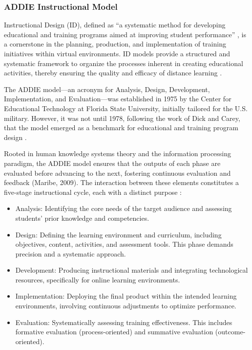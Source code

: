\documentclass[english]{textolivre}
\begin{document}
\subsubsection{ADDIE Instructional Model}\label{sec-formato}
Instructional Design (ID), defined as “a systematic method for developing educational and training programs aimed at improving student performance” \cite[p. 149]{hadi2017development}, is a cornerstone in the planning, production, and implementation of training initiatives within virtual environments. ID models provide a structured and systematic framework to organize the processes inherent in creating educational activities, thereby ensuring the quality and efficacy of distance learning \cite{raposo2020innovacion}.

The ADDIE model—an acronym for Analysis, Design, Development, Implementation, and Evaluation—was established in 1975 by the Center for Educational Technology at Florida State University, initially tailored for the U.S. military. However, it was not until 1978, following the work of Dick and Carey, that the model emerged as a benchmark for educational and training program design \cite{hadi2017development}.

Rooted in human knowledge systems theory and the information processing paradigm, the ADDIE model ensures that the outputs of each phase are evaluated before advancing to the next, fostering continuous evaluation and feedback (Maribe, 2009). The interaction between these elements constitutes a five-stage instructional cycle, each with a distinct purpose \cite{maribe2009instructional,spatioti2022comparative}:

\begin{itemize}
    \item  Analysis: Identifying the core needs of the target audience and assessing students' prior knowledge and competencies.
    \item Design: Defining the learning environment and curriculum, including objectives, content, activities, and assessment tools. This phase demands precision and a systematic approach.
    \item Development: Producing instructional materials and integrating technological resources, specifically for online learning environments.
    \item Implementation: Deploying the final product within the intended learning environments, involving continuous adjustments to optimize performance.
    \item Evaluation: Systematically assessing training effectiveness. This includes formative evaluation (process-oriented) and summative evaluation (outcome-oriented).
\end{itemize}
\end{document}
